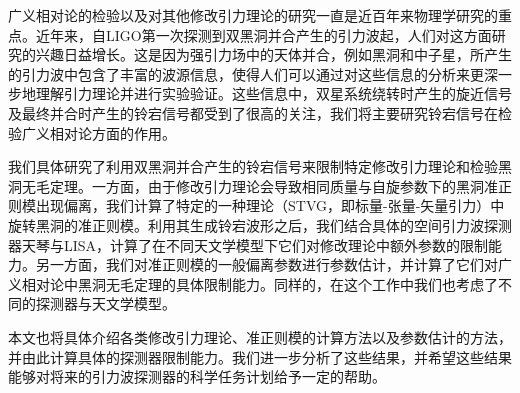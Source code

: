 
\begin{cabstract}
广义相对论的检验以及对其他修改引力理论的研究一直是近百年来物理学研究的重点。近年来，自LIGO第一次探测到双黑洞并合产生的引力波起，人们对这方面研究的兴趣日益增长。这是因为强引力场中的天体并合，例如黑洞和中子星，所产生的引力波中包含了丰富的波源信息，使得人们可以通过对这些信息的分析来更深一步地理解引力理论并进行实验验证。这些信息中，双星系统绕转时产生的旋近信号及最终并合时产生的铃宕信号都受到了很高的关注，我们将主要研究铃宕信号在检验广义相对论方面的作用。

我们具体研究了利用双黑洞并合产生的铃宕信号来限制特定修改引力理论和检验黑洞无毛定理。一方面，由于修改引力理论会导致相同质量与自旋参数下的黑洞准正则模出现偏离，我们计算了特定的一种理论（STVG，即标量-张量-矢量引力）中旋转黑洞的准正则模。利用其生成铃宕波形之后，我们结合具体的空间引力波探测器天琴与LISA，计算了在不同天文学模型下它们对修改理论中额外参数的限制能力。另一方面，我们对准正则模的一般偏离参数进行参数估计，并计算了它们对广义相对论中黑洞无毛定理的具体限制能力。同样的，在这个工作中我们也考虑了不同的探测器与天文学模型。

本文也将具体介绍各类修改引力理论、准正则模的计算方法以及参数估计的方法，并由此计算具体的探测器限制能力。我们进一步分析了这些结果，并希望这些结果能够对将来的引力波探测器的科学任务计划给予一定的帮助。

\end{cabstract}

